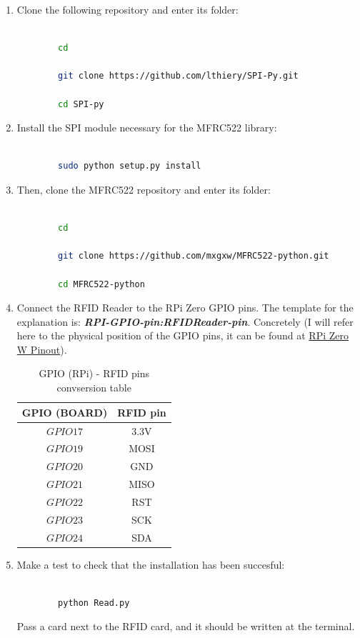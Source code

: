 \documentclass[12pt,a4paper,oneside]{article} %
\begin{document}
\begin{enumerate}
	\item Clone the following repository and enter its folder:
	\begin{lstlisting}[language=sh]
	
		cd
		
		git clone https://github.com/lthiery/SPI-Py.git
		
		cd SPI-py
	\end{lstlisting}
	\item Install the SPI module necessary for the MFRC522 library:
	\begin{lstlisting}[language=sh]
	
		sudo python setup.py install
	\end{lstlisting}
	\item Then, clone the MFRC522 repository and enter its folder:
	\begin{lstlisting}[language=sh]
	
		cd
		
		git clone https://github.com/mxgxw/MFRC522-python.git
		
		cd MFRC522-python
	\end{lstlisting}
	\item Connect the RFID Reader to the RPi Zero GPIO pins. The template for the explanation is: \textbf{\emph{RPI-GPIO-pin:RFIDReader-pin}}. Concretely (I will refer here to the physical position of the GPIO pins, it can be found at \href{https://pinout.xyz/pinout/io_pi_zero#}{RPi Zero W Pinout}).
	\setlength{\arrayrulewidth}{0.8mm}
	\begin{table}[h]
	\centering
	\begin{tabular}{| c | c |}
		\hline
		\textbf{GPIO (BOARD)} & \textbf{RFID pin} \\ \hline
		$GPIO 17$ & 3.3V \\ \hline
		$GPIO 19$ & MOSI \\ \hline
		$GPIO 20$ & GND \\ \hline
		$GPIO 21$ & MISO \\ \hline
		$GPIO 22$ & RST \\ \hline
		$GPIO 23$ & SCK \\ \hline
		$GPIO 24$ & SDA \\ \hline
	\end{tabular}
	\caption{GPIO (RPi) - RFID pins convsersion table}
	\label{gpio}
	\end{table}
	\item Make a test to check that the installation has been succesful:
	\begin{lstlisting}[language=sh]
	
		python Read.py
	\end{lstlisting}
	Pass a card next to the RFID card, and it should be written at the terminal.
\end{enumerate}
\end{document}

